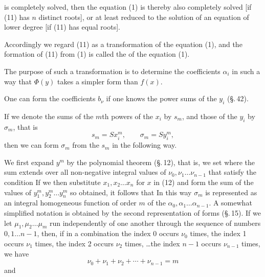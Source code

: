 
is completely solved, then the equation (1) is thereby also completely solved [if (11) has $n$ distinct roots], or at least reduced to the solution of an equation of lower degree [if (11) has equal roots].

Accordingly we regard (11) as a transformation of the equation (1), and the formation of (11) from (1) is called the  of the equation (1).

The purpose of such a transformation is to determine the coefficients $\alpha_i$ in such a way that $\Phi(y)$ takes a simpler form than $f(x)$.

One can form the coefficients $b_\nu$ if one knows the power sums of the $y_i$ (\S.\,42).

If we denote the sums of the $m$th powers of the $x_i$ by $s_m$, and those of the $y_i$ by $\sigma_m$, that is
\[
s_m = S x_i^m, \qquad \sigma_m = S y_i^m,
\]
then we can form $\sigma_m$ from the $s_m$ in the following way.

We first expand $y^m$ by the polynomial theorem (\S.\,12), that is, we set
where the sum extends over all non-negative integral values of $\nu_0, \nu_1 \dots \nu_{n-1}$ that satisfy the condition
If we then substitute $x_1, x_2 \dots x_n$ for $x$ in (12) and form the sum of the values of $y_1^m, y_2^m \dots y_n^m$ so obtained, it follows that
In this way $\sigma_m$ is represented as an integral homogeneous function of order $m$ of the $\alpha_0, \alpha_1 \dots \alpha_{n-1}$. A somewhat simplified notation is obtained by the second representation of forms (\S.\,15). If we let $\mu_1, \mu_2 \dots \mu_m$ run independently of one another through the sequence of numbers $0, 1 \dots n-1$, then, if in a combination the index 0 occurs $\nu_0$ times, the index 1 occurs $\nu_1$ times, the index 2 occurs $\nu_2$ times, \dots the index $n-1$ occurs $\nu_{n-1}$ times, we have
\[
\nu_0 + \nu_1 + \nu_2 + \cdots + \nu_{n-1} = m
\]
and
